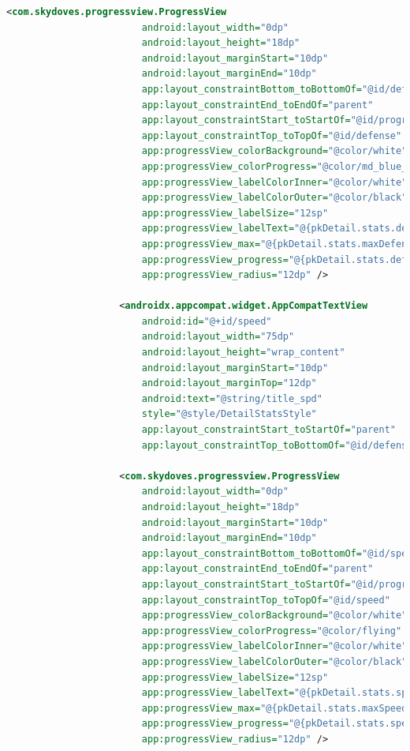 \documentclass[a4paper, 12pt]{article}
\begin{document}
\begin{lstlisting}[caption={Pokemon Detail Layout.}, label={layout:pk_detail}, language=XML]
                    <com.skydoves.progressview.ProgressView
                        android:layout_width="0dp"
                        android:layout_height="18dp"
                        android:layout_marginStart="10dp"
                        android:layout_marginEnd="10dp"
                        app:layout_constraintBottom_toBottomOf="@id/defense"
                        app:layout_constraintEnd_toEndOf="parent"
                        app:layout_constraintStart_toStartOf="@id/progress_hp"
                        app:layout_constraintTop_toTopOf="@id/defense"
                        app:progressView_colorBackground="@color/white"
                        app:progressView_colorProgress="@color/md_blue_200"
                        app:progressView_labelColorInner="@color/white"
                        app:progressView_labelColorOuter="@color/black"
                        app:progressView_labelSize="12sp"
                        app:progressView_labelText="@{pkDetail.stats.defense}"
                        app:progressView_max="@{pkDetail.stats.maxDefense}"
                        app:progressView_progress="@{pkDetail.stats.defense}"
                        app:progressView_radius="12dp" />
    
                    <androidx.appcompat.widget.AppCompatTextView
                        android:id="@+id/speed"
                        android:layout_width="75dp"
                        android:layout_height="wrap_content"
                        android:layout_marginStart="10dp"
                        android:layout_marginTop="12dp"
                        android:text="@string/title_spd"
                        style="@style/DetailStatsStyle"
                        app:layout_constraintStart_toStartOf="parent"
                        app:layout_constraintTop_toBottomOf="@id/defense" />
    
                    <com.skydoves.progressview.ProgressView
                        android:layout_width="0dp"
                        android:layout_height="18dp"
                        android:layout_marginStart="10dp"
                        android:layout_marginEnd="10dp"
                        app:layout_constraintBottom_toBottomOf="@id/speed"
                        app:layout_constraintEnd_toEndOf="parent"
                        app:layout_constraintStart_toStartOf="@id/progress_hp"
                        app:layout_constraintTop_toTopOf="@id/speed"
                        app:progressView_colorBackground="@color/white"
                        app:progressView_colorProgress="@color/flying"
                        app:progressView_labelColorInner="@color/white"
                        app:progressView_labelColorOuter="@color/black"
                        app:progressView_labelSize="12sp"
                        app:progressView_labelText="@{pkDetail.stats.speed}"
                        app:progressView_max="@{pkDetail.stats.maxSpeed}"
                        app:progressView_progress="@{pkDetail.stats.speed}"
                        app:progressView_radius="12dp" />
    

\end{lstlisting}
\end{document}
